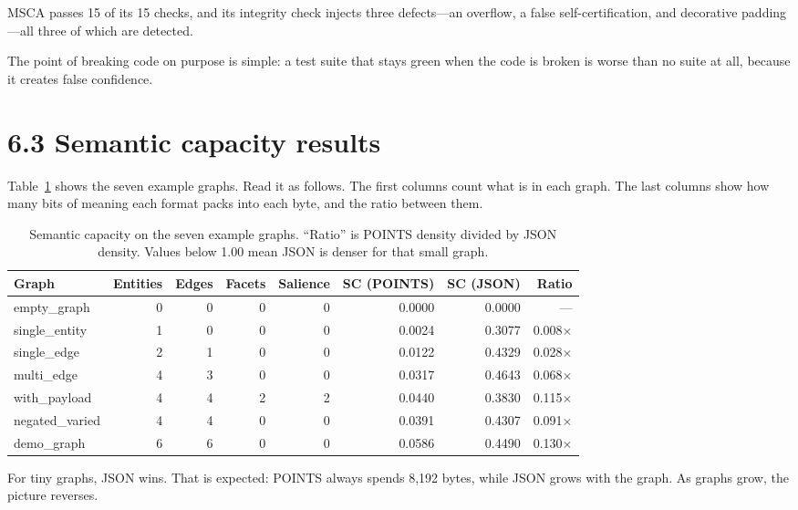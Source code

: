 MSCA passes 15 of its 15 checks, and its integrity check injects three defects---an overflow, a false self-certification, and decorative padding---all three of which are detected.

The point of breaking code on purpose is simple: a test suite that stays green when the code is broken is worse than no suite at all, because it creates false confidence.

\section*{6.3 Semantic capacity results}

Table~\ref{tab:golden_sc} shows the seven example graphs. Read it as follows. The first columns count what is in each graph. The last columns show how many bits of meaning each format packs into each byte, and the ratio between them.

\begin{table}[ht]
\centering
\caption{Semantic capacity on the seven example graphs. ``Ratio'' is POINTS density divided by JSON density. Values below 1.00 mean JSON is denser for that small graph.}
\label{tab:golden_sc}
\begin{tabular}{@{}lrrrrrrr@{}}
\toprule
Graph & Entities & Edges & Facets & Salience & SC (POINTS) & SC (JSON) & Ratio \\
\midrule
empty\_graph & 0 & 0 & 0 & 0 & 0.0000 & 0.0000 & --- \\
single\_entity & 1 & 0 & 0 & 0 & 0.0024 & 0.3077 & 0.008$\times$ \\
single\_edge & 2 & 1 & 0 & 0 & 0.0122 & 0.4329 & 0.028$\times$ \\
multi\_edge & 4 & 3 & 0 & 0 & 0.0317 & 0.4643 & 0.068$\times$ \\
with\_payload & 4 & 4 & 2 & 2 & 0.0440 & 0.3830 & 0.115$\times$ \\
negated\_varied & 4 & 4 & 0 & 0 & 0.0391 & 0.4307 & 0.091$\times$ \\
demo\_graph & 6 & 6 & 0 & 0 & 0.0586 & 0.4490 & 0.130$\times$ \\
\bottomrule
\end{tabular}
\end{table}

For tiny graphs, JSON wins. That is expected: POINTS always spends 8,192 bytes, while JSON grows with the graph. As graphs grow, the picture reverses.

